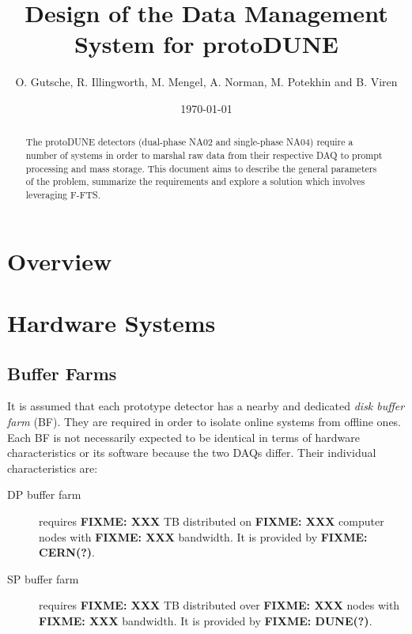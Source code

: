 \documentclass[pdftex,12pt,letter]{article}
\title{Design of the Data Management System for protoDUNE}
\date{\today}
\author{O. Gutsche, R. Illingworth, M. Mengel, A. Norman, M. Potekhin and B. Viren}
\newcommand{\fixme}[1]{\textbf{FIXME: #1}}
\begin{document}
\maketitle

\begin{abstract}
The protoDUNE detectors (dual-phase NA02 and single-phase NA04)
require a number of systems in order to marshal raw data from
their respective DAQ to prompt processing and mass storage.  This
document aims to  describe the general parameters of the problem, summarize the requirements
and explore a solution which involves leveraging F-FTS.
\end{abstract}

\tableofcontents

\pagebreak

\section{Overview}




\section{Hardware Systems}

\subsection{Buffer Farms}

It is assumed that each prototype detector has a nearby and dedicated
\textit{disk buffer farm} (BF).  They are required in order to isolate
online systems from offline ones.  Each BF is not necessarily expected
to be identical in terms of hardware characteristics or its software
because the two DAQs differ.  Their individual characteristics are:

\begin{description}
\item[DP buffer farm] requires \fixme{XXX} TB distributed on
  \fixme{XXX} computer nodes with \fixme{XXX} bandwidth.  It is
  provided by \fixme{CERN(?)}.
\item[SP buffer farm] requires \fixme{XXX} TB distributed over
  \fixme{XXX} nodes with \fixme{XXX} bandwidth.  It is provided by
  \fixme{DUNE(?)}.
\end{description}
\end{document}
